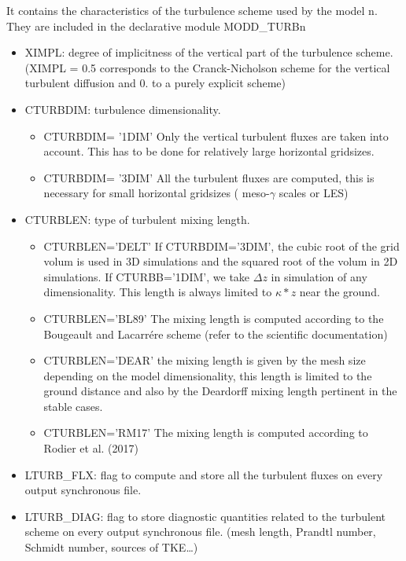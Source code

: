 It contains the characteristics of the turbulence scheme used by the model n. They are
included in the declarative module MODD\_TURBn
\begin{itemize}
\item
{}
XIMPL: degree of implicitness of the vertical part of the turbulence scheme.
(XIMPL = 0.5 corresponds to the Cranck-Nicholson scheme for the vertical
turbulent diffusion and  0. to a purely explicit scheme)
\item
{}
CTURBDIM: turbulence dimensionality. 
\begin{itemize}
\item
CTURBDIM= '1DIM'  Only the vertical turbulent fluxes are taken
into account. This has to be done for relatively large horizontal gridsizes.
\item
CTURBDIM= '3DIM'  All the turbulent fluxes are computed, this is necessary for
small horizontal gridsizes ( meso-$\gamma$ scales or LES)
\end{itemize}

\item
{}
CTURBLEN: type of turbulent mixing length.
\begin{itemize}
\item
CTURBLEN='DELT' If CTURBDIM='3DIM', the cubic root of the grid volum is used
 in 3D simulations and  the squared root of the volum in 2D simulations.
If CTURBB='1DIM', we take 
$\Delta z $ in simulation of any dimensionality. 
This length is always limited to $\kappa * z$  near the ground.
\item
CTURBLEN='BL89'
The mixing length is computed according to the Bougeault and Lacarr\'ere scheme
(refer to the scientific documentation)
\item
CTURBLEN='DEAR'
the mixing length is given by the mesh size depending on the model
dimensionality, this length is limited to the ground distance and
also by the Deardorff mixing length pertinent in the stable cases.
\item
CTURBLEN='RM17'
The mixing length is computed according to Rodier et al. (2017)
\end{itemize}

\item
{}
LTURB\_FLX: flag to compute and store all the turbulent fluxes
 on every output synchronous file.

\item
{}
LTURB\_DIAG: flag to  store diagnostic quantities related to the 
turbulent scheme  on every output synchronous file. (mesh length, Prandtl
number, Schmidt number, sources of TKE\ldots)


\end{itemize}
